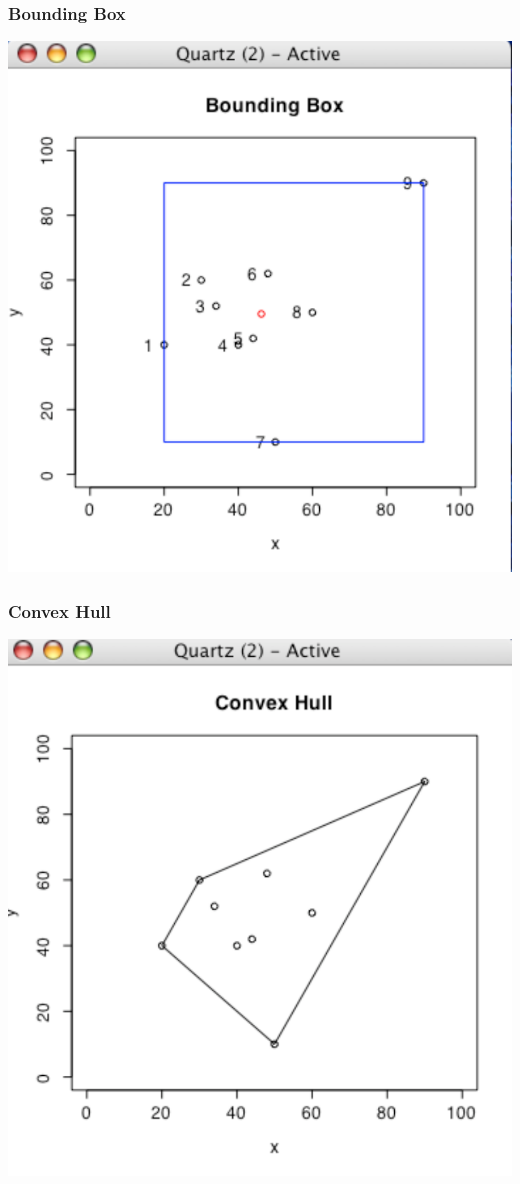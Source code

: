 \documentclass[nototal]{beamer}
\begin{document}
\begin{frame}
   \frametitle{Bounding Box}
   \begin{center}
     \includegraphics[width=.65\linewidth]{ppbbox}
   \end{center}
 \end{frame}

\begin{frame}
   \frametitle{Convex Hull}
   \begin{center}
     \includegraphics[width=.65\linewidth]{ppconvex}
   \end{center}
 \end{frame}
\end{document}
